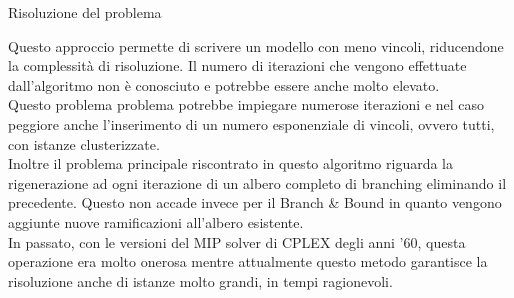 \begin{algorithm}
\caption{Risoluzione del problema}
\begin{algorithmic}
\STATE {}
\STATE {}
\STATE {}
\ENDIF
\STATE {}
\ENDWHILE
\end{algorithmic}
\end{algorithm}
Questo approccio permette di scrivere un modello con meno vincoli, riducendone la complessità di risoluzione. Il numero di iterazioni che vengono effettuate dall'algoritmo non è conosciuto e potrebbe essere anche molto elevato.\\
Questo problema problema potrebbe impiegare numerose iterazioni e nel caso peggiore anche l'inserimento di un numero esponenziale di vincoli, ovvero tutti, con istanze clusterizzate.\\
Inoltre il problema principale riscontrato in questo algoritmo riguarda la rigenerazione ad ogni iterazione di un albero completo di branching eliminando il precedente. Questo non accade invece per il Branch \& Bound in quanto vengono aggiunte nuove ramificazioni all'albero esistente.\\ In passato, con le versioni del MIP solver di CPLEX degli anni '60, questa operazione era molto onerosa mentre attualmente questo metodo garantisce la risoluzione anche di istanze molto grandi, in tempi ragionevoli.\\